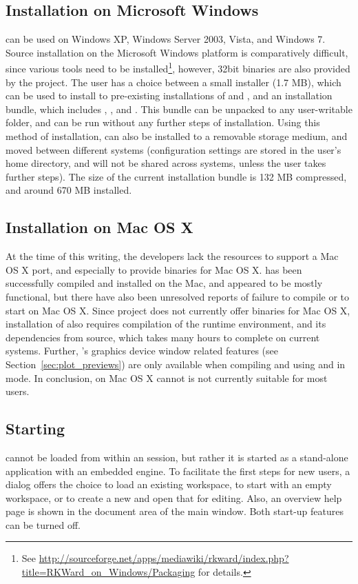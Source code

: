 \subsection{Installation on Microsoft Windows}
 can be used on Windows XP, Windows Server 2003, Vista, and Windows 7. Source installation on the
Microsoft Windows platform is comparatively difficult, since various tools need to be installed\footnote{
  See \url{http://sourceforge.net/apps/mediawiki/rkward/index.php?title=RKWard\_on\_Windows/Packaging} for details.
}, however, 32bit binaries are also provided by the project. The user has a choice between a small installer (1.7 MB),
which can be used to install  to pre-existing installations of  and , and an installation
bundle, which includes , , and . This bundle can be unpacked to any user-writable folder,
and can be run without any further steps of installation. Using this method of installation,
 can also be installed to a removable storage medium, and moved between different systems (configuration
settings are stored in the user's home directory, and will not be shared across systems, unless the user takes further steps).
The size of the current installation bundle is 132 MB compressed, and around 670 MB installed.

\subsection{Installation on Mac OS X}
At the time of this writing, the developers lack the resources to support a Mac OS X port, and especially
to provide binaries for Mac OS X.  has been successfully compiled and installed on the Mac, and
appeared to be mostly functional, but there have also been unresolved reports of failure to compile or to start
 on Mac OS X. Since  project does not currently offer binaries for Mac OS X, installation
of  also requires compilation of the  runtime environment, and its dependencies from source,
which takes many hours to complete on current systems. Further, 's graphics device window related features
(see Section~\ref{sec:plot_previews}) are only available when compiling and using  and  in
 mode. In conclusion,  on Mac OS X cannot is not currently suitable for most users.

\subsection[Starting RKWard]{Starting }
 cannot be loaded from within an 
session, but rather it is started as a stand-alone application with an
embedded  engine. To facilitate the first
steps for new users, a dialog offers the choice to load an existing
workspace, to start with an empty workspace, or to create a new
 and open that for editing. Also, an overview help page is
shown in the document area of the main window. Both start-up features
can be turned off.
